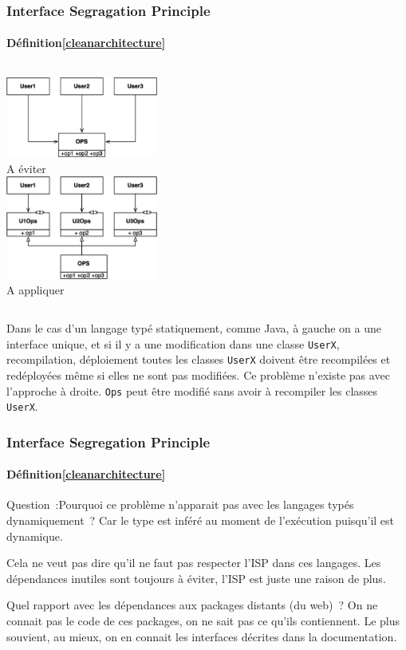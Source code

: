 \documentclass{beamer}
\begin{document}
    \begin{frame}
        \transdissolve
        \frametitle{Interface Segragation Principle}
        \framesubtitle{Définition\cref{cleanarchitecture}}
        \begin{columns}
            \centering
            \includegraphics[width=5cm]{image/i-to-avoid} \\ A éviter \\
            \centering
            \includegraphics[width=5cm]{image/i-preferred} \\ A appliquer \\
        \end{columns}
        Dans le cas d'un langage typé statiquement, comme Java, à gauche on a une interface unique, et si il y a une modification dans une classe \lstinline{UserX}, recompilation, déploiement toutes les classes \lstinline{UserX} doivent être recompilées et redéployées même si elles ne sont pas modifiées.
        \bigbreak
        Ce problème n'existe pas avec l'approche à droite. \lstinline{Ops} peut être modifié sans avoir à recompiler les classes \lstinline{UserX}.
    \end{frame}

    \begin{frame}
        \transdissolve
        \frametitle{Interface Segregation Principle}
        \framesubtitle{Définition\cref{cleanarchitecture}}
        Question~:Pourquoi ce problème n'apparait pas avec les langages typés dynamiquement~?
        \pause
        \bigbreak
        Car le type est inféré au moment de l'exécution puisqu'il est dynamique.
        \begin{dangercolorbox}
            Cela ne veut pas dire qu'il ne faut pas respecter l'ISP dans ces langages.
            Les dépendances inutiles sont toujours à éviter, l'ISP est juste une raison de plus.
        \end{dangercolorbox}
        Quel rapport avec les dépendances aux packages distants (du web)~?
        \pause
        \bigbreak
        On ne connait pas le code de ces packages, on ne sait pas ce qu'ils contiennent.
        Le plus souvient, au mieux, on en connait les interfaces décrites dans la documentation.
    \end{frame}
\end{document}
